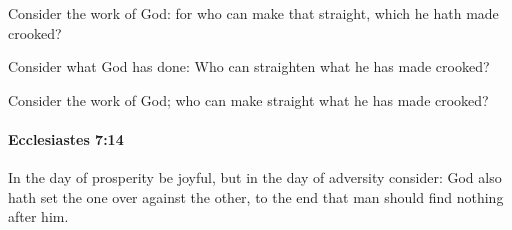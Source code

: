 			\begin{versebox}
					\item[BHS] 
					\item[LXX] 
					\item[ASV] Consider the work of God: for who can make that straight, which he hath made crooked?
					\item[NIV] Consider what God has done: Who can straighten what he has made crooked?
					\item[NRSV] Consider the work of God; who can make straight what he has made crooked?
			\end{versebox}

		\paragraph{Ecclesiastes 7:14} %
			\label{ECCLESIASTES-7-14}

			In the day of prosperity be joyful, but in the day of adversity consider: God also hath set the one over against the other, to the end that man should find nothing after him.


